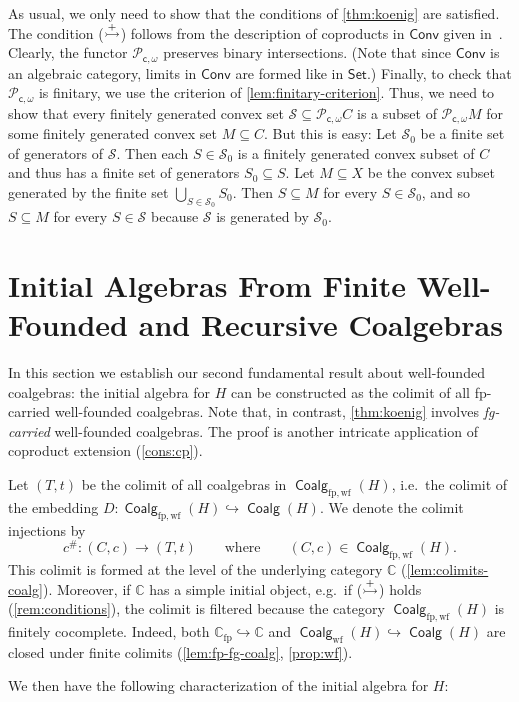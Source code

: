 \documentclass[10pt,a4paper]{article}
\theoremstyle{definition}
\theoremstyle{remark}
\numberwithin{equation}{section}
\providecommand{\catname}{\mathsf}
\def\Set{\catname{Set}}
\def\Conv{\catname{Conv}}
\newcommand{\Pow}{\mathcal{P}}
\renewcommand{\S}{{\mathcal{S}}}
\newcommand{\seq}{\subseteq}
\providecommand{\C}{}
\newcommand{\fp}{{\mathrm{fp}}}
\newcommand{\wf}{{\mathrm{wf}}}
\newcommand{\fwf}{\Coalg_{\fp,\wf}(H)}
\renewcommand{\C}{{\mathbb{C}}}
\newcommand{\CPowf}{\Pow_{\mathsf{c},\omega}}
\DeclareMathOperator{\Coalg}{\mathsf{Coalg}}
\newcommand{\subto}{\hookrightarrow}
\newenvironment{proofhere}[2][Proof of]{    \proof{#1~\autoref{#2}}    }{  \endproof  \par}
\newenvironment{proofappendix}[2][Proof of]{    \begin{proofhere}[#1]{#2}\label{#2:proof}
  }{    \end{proofhere}
  }
\newcommand{\injmono}{\ensuremath{\overset{\smash{\raisebox{-1pt}{\ensuremath{\scriptstyle+}}}}{\rightarrowtail}}}\newcommand{\hpresint}{\ensuremath{H\cap}\xspace}
\theoremstyle{plain}
\theoremstyle{definition}
\begin{document}
\begin{proofappendix}{thm:koenig-convex}
As usual, we only need to show that the conditions of \autoref{thm:koenig} are satisfied. The condition (\injmono) follows from the description of coproducts in $\Conv$ given in~\cite[Prop.~5]{jww15}. Clearly, the functor $\CPowf$ preserves binary intersections. (Note that since $\Conv$ is an algebraic category, limits in $\Conv$ are formed like in $\Set$.) Finally, to check that $\CPowf$ is finitary, we use the criterion of \autoref{lem:finitary-criterion}. Thus, we need to show that every finitely generated convex set $\mathcal{S}\seq \CPowf C$ is a subset of $\CPowf M$ for some finitely generated convex set $M\seq C$. But this is easy: Let $\S_0$ be a finite set of generators of $\S$. Then each $S\in \S_0$ is a finitely generated convex subset of $C$ and thus has a finite set of generators $S_0\seq S$. Let $M\seq X$ be the convex subset generated by the finite set $\bigcup_{S\in \S_0} S_0$. Then $S\seq M$ for every $S\in \S_0$, and so $S\seq M$ for every $S\in \S$ because $\S$ is generated by $\S_0$.
\end{proofappendix}

\section{Initial Algebras From Finite Well-Founded and Recursive Coalgebras}\label{sec:initial-algebras}
In this section we establish our second fundamental result about well-founded coalgebras: the initial algebra for $H$ can be constructed as the colimit of all fp-carried well-founded coalgebras. Note that, in contrast, \autoref{thm:koenig} involves \emph{fg-carried} well-founded coalgebras. The proof is another intricate application of coproduct extension (\autoref{cons:cp}).

\begin{construction}\label{not:T}
Let $(T,t)$ be the colimit of all coalgebras in $\fwf$, i.e.\ the colimit of the embedding
$D\colon \Coalg_{\fp,\wf}(H)\subto \Coalg(H)$.
We denote the colimit injections by
\[ c^\#\colon (C,c)\to (T,t) \qquad \text{where} \qquad (C,c)\in \fwf. \]
This colimit is formed at the level of the underlying category $\C$ (\autoref{lem:colimits-coalg}). Moreover, if $\C$  has a simple initial object, e.g.~if (\injmono) holds (\autoref{rem:conditions}), the colimit is filtered because the category $\fwf$ is finitely cocomplete. Indeed, both $\C_\fp\hookrightarrow \C$ and $\Coalg_\wf(H)\hookrightarrow \Coalg(H)$ are closed under finite colimits (\autoref{lem:fp-fg-coalg}, \autoref{prop:wf}).
\end{construction}
We then have the following characterization of the initial algebra for $H$:
\end{document}

